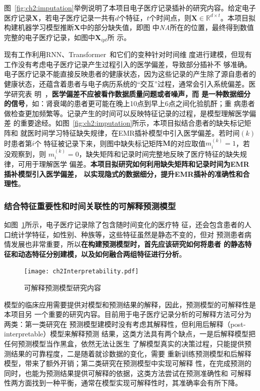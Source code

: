图~\ref{fig:ch2:imputation}举例说明了本项目电子医疗记录插补的研究内容。给定电子
医疗记录$\bm X$，若电子医疗记录一共有$d$个特征，$t$个时间点，则$\bm X \in
\mathbb{R}^{d\times t}$。本项目拟构建机器学习模型推断$\bm X$中的部分缺失值，即图
中\textit{NA}所在的位置，最终得到数值完整的电子医疗记录，如图中$\bm X_{ipt}$所
示。

现有工作利用RNN、Transformer~和它们的变种针对时间维
度进行建模，但现有工作没有考虑电子医疗记录产生过程引入的医学偏差，导致部分插补不
够准确。电子医疗记录不能直接反映患者的健康状态，因为这些记录的产生除了源自患者的
健康状态，还蕴含着患者与电子病历系统的“交互”过程，通常会引入系统偏差。医学研究表
明~，\textbf{医学偏差不应被看作数据质量问题或者噪声，而
是一种数据细分的信号}，如：肾衰竭的患者更可能在晚上10点到早上6点之间化验肌酐；重
病患者做检查更加频繁等。记录产生的时间可以反映特征记录的过程，是模型理解医学偏差
的重要途经。如图~\ref{fig:ch2:imputation}所示，本项目拟结合患者的缺失标记矩阵和
就医时间学习特征缺失规律，在EMR插补模型中引入医学偏差。若时间$(k)$时患者第$i$个
特征被记录下来，则图中缺失标记矩阵$\bm M$的对应取值$m_i^{(k)}=1$，若没观察到，则
$m_i^{(k)}=0$，缺失矩阵和记录时间完整地反映了医疗特征的缺失规律，可用于理解医学
偏差。\textbf{本项目拟研究如何利用缺失矩阵和记录时间为EMR插补模型引入医学偏差，
以实现隐式的数据细分，提升EMR插补的准确性和合理性}。

\subsubsection{结合特征重要性和时间关联性的可解释预测模型}

如图~\ref{fig:ch2:interpretability}所示，电子医疗记录除了包含随时间变化的医疗特
征，还会包含患者的人口统计学特征，如性别、种族等，这些特征虽然是静态不变的，但对
预测患者病情发展也非常重要，所以\textbf{在构建预测模型时，首先应该研究如何将患者
的静态特征和动态特征分别建模，以及如何融合两组特征进行分析}。

\begin{figure}
    \begin{small}
        \begin{center}
            \texttt{[image: ch2Interpretability.pdf]}
        \end{center}
        \caption{可解释预测模型研究内容}
        \label{fig:ch2:interpretability}
    \end{small}
\end{figure}

模型的临床应用需要提供对模型和预测结果的解释，因此，预测模型的可解释性是本项目另
一个重要的研究内容。目前用于电子医疗记录分析的可解释方法可分为两类：第一类研究在
预测模型建模时没有考虑其解释性，但利用后解释（post-interpretable）模型来解释预测
结果，这类方法具有两个缺点，一是后解释模型把任何预测模型当作黑盒，依然无法让医生
了解模型真实的决策过程，只能提供预测结果的可靠程度，二是随着就诊数据的变化，需要
重新训练预测模型和后解释模型，带来了额外开销；第二类研究在预测模型中实现可解释
性，在完成预测的同时，也能为预测结果提供可解释的依据，这类方法尝试在预测准确性和
可解释性两方面找到一种平衡，通常在模型实现可解释性时，其准确率会有所下降。

